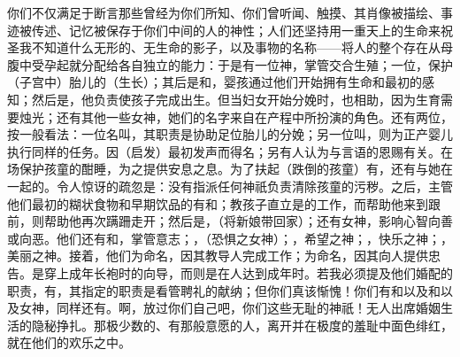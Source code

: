 你们不仅满足于断言那些曾经为你们所知、你们曾听闻、触摸、其肖像被描绘、事迹被传述、记忆被保存于你们中间的人的神性；人们还坚持用一重天上的生命来祝圣我不知道什么无形的、无生命的影子，以及事物的名称——将人的整个存在从母腹中受孕起就分配给各自独立的能力：于是有一位神，掌管交合生殖；一位，保护（子宫中）胎儿的（生长）；其后是和，婴孩通过他们开始拥有生命和最初的感知；然后是，他负责使孩子完成出生。但当妇女开始分娩时，也相助，因为生育需要烛光；还有其他一些女神，她们的名字来自在产程中所扮演的角色。还有两位，按一般看法：一位名叫，其职责是协助足位胎儿的分娩；另一位叫，则为正产婴儿执行同样的任务。因（启发）最初发声而得名；另有人认为与言语的恩赐有关。在场保护孩童的酣睡，为之提供安息之息。为了扶起（跌倒的孩童）有，还有与她在一起的。令人惊讶的疏忽是：没有指派任何神祇负责清除孩童的污秽。之后，主管他们最初的糊状食物和早期饮品的有和；教孩子直立是的工作，而帮助他来到跟前，则帮助他再次蹒跚走开；然后是，（将新娘带回家）；还有女神，影响心智向善或向恶。他们还有和，掌管意志；，（恐惧之女神）；，希望之神；，快乐之神；，美丽之神。接着，他们为命名，因其教导人完成工作；为命名，因其向人提供忠告。是穿上成年长袍时的向导，而则是在人达到成年时。若我必须提及他们婚配的职责，有，其指定的职责是看管聘礼的献纳；但你们真该惭愧！你们有和以及和以及女神，同样还有。啊，放过你们自己吧，你们这些无耻的神祇！无人出席婚姻生活的隐秘挣扎。那极少数的、有那般意愿的人，离开并在极度的羞耻中面色绯红，就在他们的欢乐之中。\par

